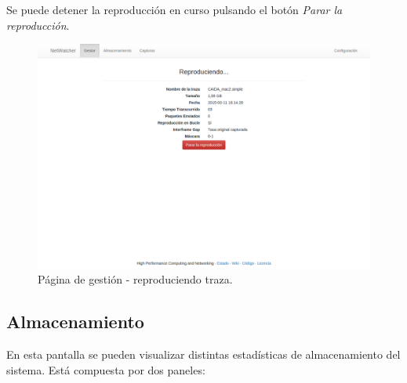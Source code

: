 Se puede detener la reproducción en curso pulsando el botón \textit{Parar la reproducción}.

\begin{figure}[!htp]
  \centering
  \includegraphics[width=\textwidth,clip=true]{graphics/capturas/gestor_reproduccion}
  \caption{Página de gestión - reproduciendo \gls{traza}.}
  \label{fig:captura:gestionreproduciendo}
\end{figure}


\subsection{Almacenamiento\label{extra:manual:almacenamiento}}

En esta pantalla se pueden visualizar distintas estadísticas de almacenamiento del sistema. Está compuesta por dos paneles:

